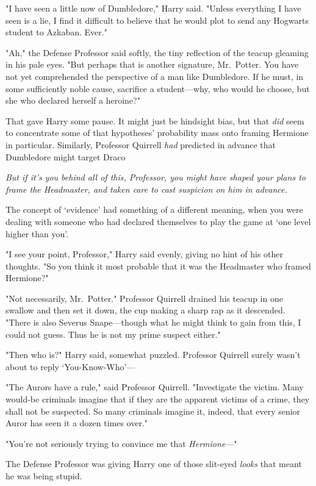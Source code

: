 "I have seen a little now of Dumbledore," Harry said. "Unless everything I have
seen is a lie, I find it difficult to believe that he would plot to send any
Hogwarts student to Azkaban. Ever."

"Ah," the Defense Professor said softly, the tiny reflection of the teacup
gleaming in his pale eyes. "But perhaps that is another signature, Mr.~Potter.
You have not yet comprehended the perspective of a man like Dumbledore. If he
must, in some sufficiently noble cause, sacrifice a student---why, who would he
choose, but she who declared herself a heroine?"

That gave Harry some pause. It might just be hindsight bias, but that
\emph{did} seem to concentrate some of that hypotheses' probability mass onto
framing Hermione in particular. Similarly, Professor Quirrell \emph{had}
predicted in advance that Dumbledore might target Draco{\el}

\emph{But if it's you behind all of this, Professor, you might have shaped your
plans to frame the Headmaster, and taken care to cast suspicion on him in
advance.}

The concept of `evidence' had something of a different meaning, when you were
dealing with someone who had declared themselves to play the game at `one level
higher than you'.

"I see your point, Professor," Harry said evenly, giving no hint of his other
thoughts. "So you think it most probable that it was the Headmaster who framed
Hermione?"

"Not necessarily, Mr.~Potter." Professor Quirrell drained his teacup in one
swallow and then set it down, the cup making a sharp rap as it descended.
"There is also Severus Snape---though what he might think to gain from this, I
could not guess. Thus he is not my prime suspect either."

"Then who is?" Harry said, somewhat puzzled. Professor Quirrell surely wasn't
about to reply `You-Know-Who'---

"The Aurors have a rule," said Professor Quirrell. "Investigate the victim.
Many would-be criminals imagine that if they are the apparent victims of a
crime, they shall not be suspected. So many criminals imagine it, indeed, that
every senior Auror has seen it a dozen times over."

"You're not seriously trying to convince me that \emph{Hermione}\mbox{---}"

The Defense Professor was giving Harry one of those slit-eyed \emph{looks} that
meant he was being stupid.

